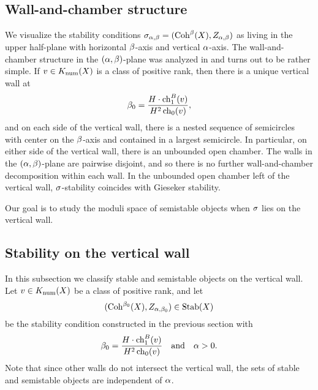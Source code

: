 \subsection{Wall-and-chamber structure}
We visualize the stability conditions $\sigma_{\alpha,\beta} = (\operatorname{\mathrm{Coh}}^\beta(X), Z_{\alpha,\beta})$ as living in the upper half-plane with horizontal $\beta$-axis and vertical $\alpha$-axis. The wall-and-chamber structure in the $(\alpha,\beta)$-plane was analyzed in \cite{maciocia} and turns out to be rather simple. If $v \in K_{\mathrm{num}}(X)$ is a class of positive rank, then there is a unique vertical wall at 
\[ \beta_0 = \frac{H \cdot \operatorname{\mathrm{ch}}_1^B(v)}{H^2 \operatorname{\mathrm{ch}}_0(v)}, \] and on each side of the vertical wall, there is a nested sequence of semicircles with center on the $\beta$-axis and contained in a largest semicircle. In particular, on either side of the vertical wall, there is an unbounded open chamber. The walls in the $(\alpha,\beta)$-plane are pairwise disjoint, and so there is no further wall-and-chamber decomposition within each wall. In the unbounded open chamber left of the vertical wall, $\sigma$-stability coincides with Gieseker stability.
\begin{center}
\end{center}
Our goal is to study the moduli space of semistable objects when $\sigma$ lies on the vertical wall.

\subsection{Stability on the vertical wall}\label{section:stabvertwall}
In this subsection we classify stable and semistable objects on the vertical wall. Let $v \in K_{\mathrm{num}}(X)$ be a class of positive rank, and let 
\[ (\operatorname{\mathrm{Coh}}^{\beta_0}(X), Z_{\alpha,\beta_0}) \in \operatorname{\mathrm{Stab}}(X) \] 
be the stability condition constructed in the previous section with 
\[ \beta_0 = \frac{H \cdot \operatorname{\mathrm{ch}}_1^B(v)}{H^2 \operatorname{\mathrm{ch}}_0(v)} \quad \mathrm{and} \quad \alpha > 0. \] Note that since other walls do not intersect the vertical wall, the sets of stable and semistable objects are independent of $\alpha$.

